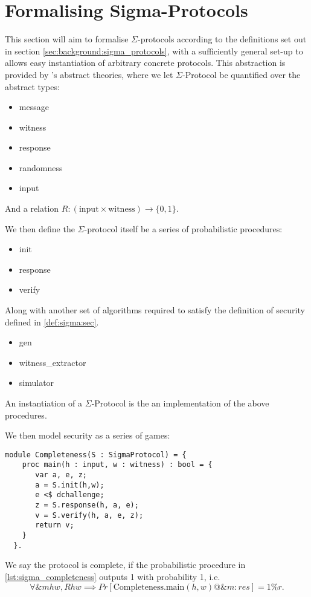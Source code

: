 \chapter{Formalising Sigma-Protocols}
\label{ch:formal_sigma}
This section will aim to formalise $\Sigma$-protocols according to the
definitions set out in section \ref{sec:background:sigma_protocols}, with a
sufficiently general set-up to allows easy instantiation of arbitrary concrete
protocols.
This abstraction is provided by \easycrypt's abstract theories, where we let
$\Sigma$-Protocol be quantified over the abstract types:
\begin{itemize}
  \item message
  \item witness
  \item response
  \item randomness
  \item input
\end{itemize}

And a relation $R : (\text{input} \times \text{witness}) \rightarrow \{0,1\}$.

We then define the $\Sigma$-protocol itself be a series of probabilistic procedures:
\begin{itemize}
  \item init
  \item response
  \item verify
\end{itemize}


Along with another set of algorithms required to satisfy the definition of
security defined in \ref{def:sigma:sec}.

\begin{itemize}
  \item gen
  \item witness\_extractor
  \item simulator
\end{itemize}

An instantiation of a $\Sigma$-Protocol is the an implementation of the above procedures.

We then model security as a series of games:

\begin{definition}[Completeness]
  \begin{lstlisting}[float, label=lst:sigma_completeness,caption=Completeness game for $\Sigma$-Protocols]
  module Completeness(S : SigmaProtocol) = {
    proc main(h : input, w : witness) : bool = {
       var a, e, z;
       a = S.init(h,w);
       e <$ dchallenge;
       z = S.response(h, a, e);
       v = S.verify(h, a, e, z);
       return v;
    }
  }.
  \end{lstlisting}
  We say the protocol is complete, if the probabilistic procedure in
  \ref{lst:sigma_completeness} outputs 1 with probability 1, i.e.
  \begin{equation}
    \label{eq:sigma_completeness}
    \forall \&m h w, R h w \implies Pr[\text{Completeness.main}(h,w) @ \&m : res] = 1\%r.
  \end{equation}
\end{definition}

